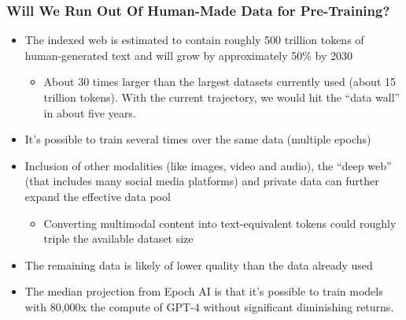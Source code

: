 \documentclass[aspectratio=169]{beamer}
\begin{document}
    \begin{frame}
        \frametitle{Will We Run Out Of Human-Made Data for Pre-Training?}
        \begin{itemize}
            \item The indexed web is estimated to contain roughly 500 trillion tokens of human-generated text and will grow by approximately 50\% by 2030
            \begin{itemize}
                \item About 30 times larger than the largest datasets currently used (about 15 trillion tokens).
                With the current trajectory, we would hit the ``data wall'' in about five years.
            \end{itemize}
            \item It's possible to train several times over the same data (multiple epochs)
            \item Inclusion of other modalities (like images, video and audio), the ``deep web'' (that includes many social media platforms) and private data can further expand the effective data pool
            \begin{itemize}
                \item Converting multimodal content into text-equivalent tokens could roughly triple the available dataset size
            \end{itemize}
            \item The remaining data is likely of lower quality than the data already used
            \item The median projection from Epoch AI is that it's possible to train models with 80,000x the compute of GPT-4 without significant diminishing returns.
        \end{itemize}
    \end{frame}
\end{document}
